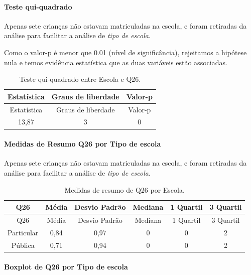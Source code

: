 \documentclass[]{article}
\let\oldparagraph\paragraph
\renewcommand{\paragraph}[1]{\oldparagraph{#1}\mbox{}}
\begin{document}
\hypertarget{teste-qui-quadrado-66}{%
\paragraph{Teste qui-quadrado}\label{teste-qui-quadrado-66}}

Apenas sete crianças não estavam matriculadas na escola, e foram retiradas da análise para facilitar a análise de \emph{tipo de escola}.

Como o valor-p é menor que 0.01 (nível de significância), rejeitamos a hipótese nula e temos evidência estatística que as duas variáveis estão associadas.

\begin{longtable}[]{@{}ccc@{}}
\caption{\label{tab:unnamed-chunk-763}Teste qui-quadrado entre Escola e Q26.}\tabularnewline
\toprule
Estatística & Graus de liberdade & Valor-p\tabularnewline
\midrule
\endfirsthead
\toprule
Estatística & Graus de liberdade & Valor-p\tabularnewline
\midrule
\endhead
13,87 & 3 & 0\tabularnewline
\bottomrule
\end{longtable}

\cleardoublepage

\hypertarget{medidas-de-resumo-q26-por-tipo-de-escola}{%
\paragraph{Medidas de Resumo Q26 por Tipo de escola}\label{medidas-de-resumo-q26-por-tipo-de-escola}}

Apenas sete crianças não estavam matriculadas na escola, e foram retiradas da análise para facilitar a análise de \emph{tipo de escola}.

\begin{longtable}[]{@{}cccccc@{}}
\caption{\label{tab:unnamed-chunk-764}Medidas de resumo de Q26 por Escola.}\tabularnewline
\toprule
Q26 & Média & Desvio Padrão & Mediana & 1 Quartil & 3 Quartil\tabularnewline
\midrule
\endfirsthead
\toprule
Q26 & Média & Desvio Padrão & Mediana & 1 Quartil & 3 Quartil\tabularnewline
\midrule
\endhead
Particular & 0,84 & 0,97 & 0 & 0 & 2\tabularnewline
Pública & 0,71 & 0,94 & 0 & 0 & 2\tabularnewline
\bottomrule
\end{longtable}

\hypertarget{boxplot-de-q26-por-tipo-de-escola}{%
\paragraph{Boxplot de Q26 por Tipo de escola}\label{boxplot-de-q26-por-tipo-de-escola}}
\end{document}
